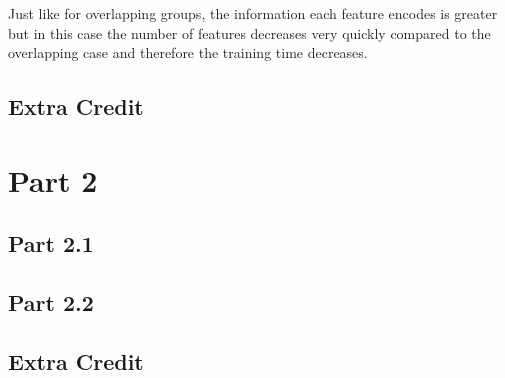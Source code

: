 \documentclass[11pt]{article}
\begin{document}
Just like for overlapping groups, the information each feature encodes is greater but in this case the number of features decreases very quickly compared to the overlapping case and therefore the training time decreases.

\subsection*{Extra Credit}

\section*{Part 2}

\subsection*{Part 2.1}

\subsection*{Part 2.2}

\subsection*{Extra Credit}
\end{document}
